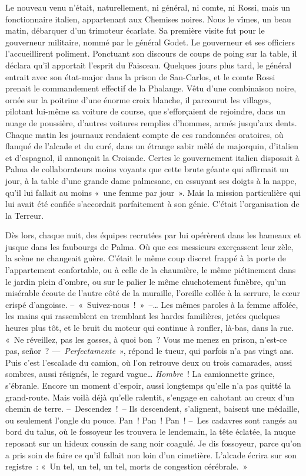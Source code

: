 \documentclass[french,twoside]{book} %
\begin{document}
Le nouveau venu n’était, naturellement, ni général, ni comte, ni Rossi, mais un fonctionnaire italien, appartenant aux Chemises noires. Nous le vîmes, un beau matin, débarquer d’un trimoteur écarlate. Sa première visite fut pour le gouverneur militaire, nommé par le général Godet. Le gouverneur et ses officiers l’accueillirent poliment. Ponctuant son discours de coups de poing sur la table, il déclara qu’il apportait l’esprit du Faisceau. Quelques jours plus tard, le général entrait avec son état-major dans la prison de San-Carlos, et le comte Rossi prenait le commandement effectif de la Phalange. Vêtu d’une combinaison noire, ornée sur la poitrine d’une énorme croix blanche, il parcourut les villages, pilotant lui-même sa voiture de course, que s’efforçaient de rejoindre, dans un nuage de poussière, d’autres voitures remplies d’hommes, armés jusqu’aux dents. Chaque matin les journaux rendaient compte de ces randonnées oratoires, où flanqué de l’alcade et du curé, dans un étrange sabir mêlé de majorquin, d’italien et d’espagnol, il annonçait la Croisade. Certes le gouvernement italien disposait à Palma de collaborateurs moins voyants que cette brute géante qui affirmait un jour, à la table d’une grande dame palmesane, en essuyant ses doigts à la nappe, qu’il lui fallait au moins « une femme par jour ». Mais la mission particulière qui lui avait été confiée s’accordait parfaitement à son génie. C’était l’organisation de la Terreur.\par
Dès lors, chaque nuit, des équipes recrutées par lui opérèrent dans les hameaux et jusque dans les faubourgs de Palma. Où que ces messieurs exerçassent leur zèle, la scène ne changeait guère. C’était le même coup discret frappé à la porte de l’appartement confortable, ou à celle de la chaumière, le même piétinement dans le jardin plein d’ombre, ou sur le palier le même chuchotement funèbre, qu’un misérable écoute de l’autre côté de la muraille, l’oreille collée à la serrure, le cœur crispé d’angoisse. – « Suivez-nous ! » –… Les mêmes paroles à la femme affolée, les mains qui rassemblent en tremblant les hardes familières, jetées quelques heures plus tôt, et le bruit du moteur qui continue à ronfler, là-bas, dans la rue. « Ne réveillez, pas les gosses, à quoi bon ? Vous me menez en prison, n’est-ce pas, señor ? — \emph{Perfectamente} », répond le tueur, qui parfois n’a pas vingt ans. Puis c’est l’escalade du camion, où l’on retrouve deux ou trois camarades, aussi sombres, aussi résignés, le regard vague… \emph{Hombre} ! La camionnette grince, s’ébranle. Encore un moment d’espoir, aussi longtemps qu’elle n’a pas quitté la grand-route. Mais voilà déjà qu’elle ralentit, s’engage en cahotant au creux d’un chemin de terre. – Descendez ! – Ils descendent, s’alignent, baisent une médaille, ou seulement l’ongle du pouce. Pan ! Pan ! Pan ! – Les cadavres sont rangés au bord du talus, où le fossoyeur les trouvera le lendemain, la tête éclatée, la nuque reposant sur un hideux coussin de sang noir coagulé. Je dis fossoyeur, parce qu’on a pris soin de faire ce qu’il fallait non loin d’un cimetière. L’alcade écrira sur son registre : « Un tel, un tel, un tel, morts de congestion cérébrale. »\par
 \par
\end{document}
